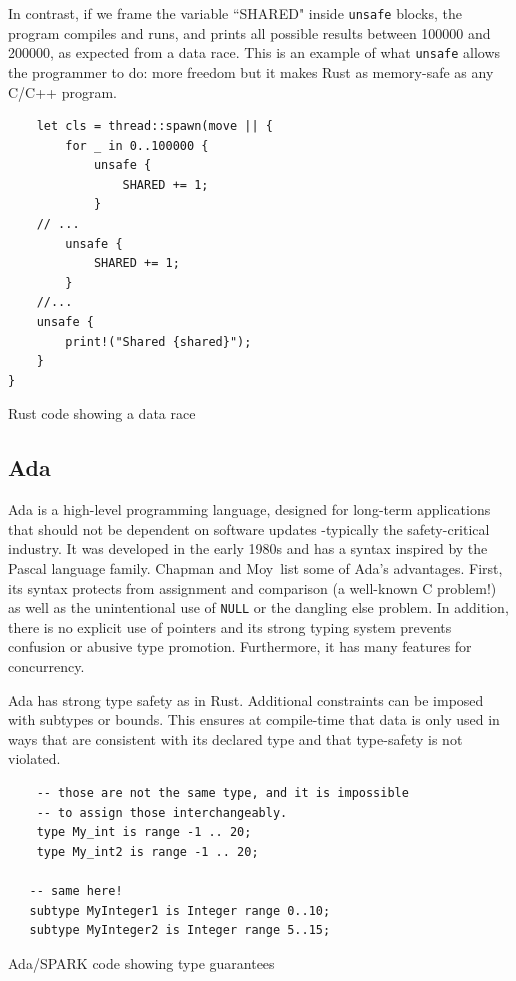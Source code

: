 \documentclass[nomenclature, english, bibtex]{kththesis}
\begin{document}
In contrast, if we frame the variable ``SHARED" inside \texttt{unsafe} blocks, the program compiles and runs, and prints all possible results between 100000 and 200000, as expected from a data race. This is an example of what \texttt{unsafe} allows the programmer to do: more freedom but it makes Rust as memory-safe as any C/C++ program.

\begin{listing}[!ht]
\begin{verbatim}
    let cls = thread::spawn(move || {
        for _ in 0..100000 {
            unsafe {
                SHARED += 1;
            }
    // ...
        unsafe {
            SHARED += 1;
        }
    //...
    unsafe {
        print!("Shared {shared}");
    }
}
\end{verbatim}
\caption[Rust code showing a data race]{Rust code showing a data race }
\label{lstlisting:data_race2}
\end{listing}
\FloatBarrier



\subsection{Ada}

Ada is a high-level programming language, designed for long-term applications that should not be dependent on software updates -typically the safety-critical industry. It was developed in the early 1980s and has a syntax inspired by the Pascal language family.
Chapman and Moy\,\cite{chapman_adacore_2018} list some of Ada's advantages. First, its syntax protects from assignment and comparison (a well-known C problem!) as well as the unintentional use of \texttt{NULL} or the dangling else problem. In addition, there is no explicit use of pointers and its strong typing system prevents confusion or abusive type promotion. Furthermore, it has many features for concurrency.

Ada has strong type safety as in Rust. Additional constraints can be imposed with subtypes or bounds. This ensures at compile-time that data is only used in ways that are consistent with its declared type and that type-safety is not violated.

 \begin{listing}[!ht]
    \begin{verbatim}
    -- those are not the same type, and it is impossible
    -- to assign those interchangeably.
    type My_int is range -1 .. 20;
    type My_int2 is range -1 .. 20;
   
   -- same here!
   subtype MyInteger1 is Integer range 0..10;
   subtype MyInteger2 is Integer range 5..15;
\end{verbatim}
\caption[Ada/SPARK code showing type guarantees]{Ada/SPARK code showing type guarantees}
\label{lstlisting:spark_datatypes}
 \end{listing}
\end{document}
